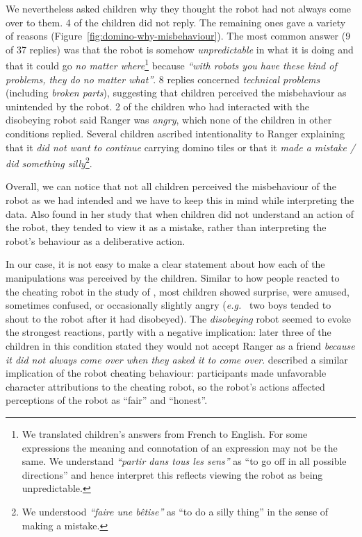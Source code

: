 \documentclass{sig-alternate}
\newcommand{\eg}{{\textit{e.g.~}}}
\begin{document}
We nevertheless asked children why they thought the robot had not always come
over to them. 4 of the children did not reply. The remaining ones gave a variety
of reasons (Figure~\ref{fig:domino-why-misbehaviour}). The most common answer (9
of 37 replies) was that the robot is somehow \textit{unpredictable} in what it
is doing and that it could go \textit{no matter where}\footnote{We translated
children's answers from French to English. For some expressions the meaning
and connotation of an expression may not be the same. We understand
\textit{``partir dans tous les sens''} as ``to go off in all possible
directions'' and hence interpret this reflects viewing the robot as being
unpredictable.} because \textit{``with robots you have these kind of problems,
they do no matter what''}. 8 replies concerned \textit{technical problems}
(including \textit{broken parts}), suggesting that children perceived the
misbehaviour as unintended by the robot. 2 of the children who had interacted
with the disobeying robot said Ranger was \textit{angry}, which none of the
children in other conditions replied. Several children ascribed intentionality
to Ranger explaining that it \textit{did not want to continue} carrying domino
tiles or that it \textit{made a mistake / did something silly}\footnote{We
understood \textit{``faire une bêtise''} as ``to do a silly thing'' in the sense
of making a mistake.}.

Overall, we can notice that not all children perceived the misbehaviour of the
robot as we had intended and we have to keep this in mind while interpreting the
data. Also \cite{leite_long-term_2013} found in her study that when children did
not understand an action of the robot, they tended to view it as a mistake,
rather than interpreting the robot's behaviour as a deliberative action.


In our case, it is not easy to make a clear statement about how each of the
manipulations was perceived by the children.  Similar to how people reacted to
the cheating robot in the study of \cite{short_no_2010}, most children showed
surprise, were amused, sometimes confused, or occasionally slightly angry (\eg
two boys tended to shout to the robot after it had disobeyed). The
\textit{disobeying} robot seemed to evoke the strongest reactions, partly with a
negative implication: later three of the children in this condition stated they
would not accept Ranger as a friend \textit{because it did not always come over
when they asked it to come over}. \cite{short_no_2010} described a similar
implication of the robot cheating behaviour: participants made unfavorable
character attributions to the cheating robot, so the robot's actions affected
perceptions of the robot as ``fair'' and ``honest''.
\end{document}
